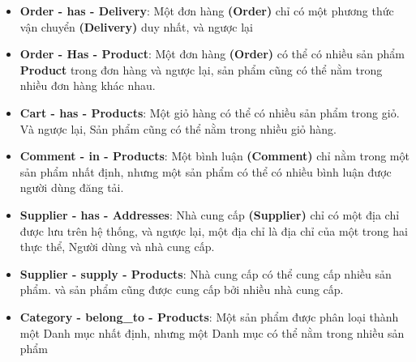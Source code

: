 \begin{itemize}
    \item \textbf{Order - has - Delivery}: Một đơn hàng \textbf{(Order)} chỉ có một phương thức vận chuyển \textbf{(Delivery)} duy nhất, và ngược lại 

    \item \textbf{Order - Has - Product}: Một đơn hàng \textbf{(Order)} có thể có nhiều sản phẩm \textbf{Product} trong đơn hàng và ngược lại, sản phẩm cũng có thể nằm trong nhiều đơn hàng khác nhau.

    \item \textbf{Cart - has - Products}: Một giỏ hàng có thể có nhiều sản phẩm trong giỏ. Và ngược lại, Sản phẩm cũng có thể nằm trong nhiều giỏ hàng.

    \item \textbf{Comment - in - Products}: Một bình luận \textbf{(Comment)} chỉ nằm trong một sản phẩm nhất định, nhưng một sản phẩm có thể có nhiều bình luận được người dùng đăng tải.

    \item \textbf{Supplier - has - Addresses}: Nhà cung cấp \textbf{(Supplier)} chỉ có một địa chỉ được lưu trên hệ thống, và ngược lại, một địa chỉ là địa chỉ của một trong hai thực thể, Người dùng và nhà cung cấp.

    \item \textbf{Supplier - supply - Products}: Nhà cung cấp có thể cung cấp nhiều sản phẩm. và sản phẩm cũng được cung cấp bởi nhiều nhà cung cấp.

    \item \textbf{Category - belong\_to - Products}: Một sản phẩm được phân loại thành một Danh mục nhất định, nhưng một Danh mục có thể nằm trong nhiều sản phẩm
\end{itemize} 

\newpage
